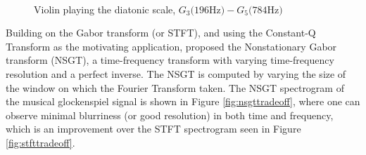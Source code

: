 \documentclass[report.tex]{subfiles}
\begin{document}
\begin{figure}[ht]
	\centering
	\\
	\caption{Violin playing the diatonic scale, $G_{3} \text{(196Hz)} - G_{5} \text{(784Hz)}$ \parencite[430]{jbrown}}
	\label{fig:violin}
\end{figure}

Building on the Gabor transform (or STFT), and using the Constant-Q Transform as the motivating application, \textcite{balazs} proposed the Nonstationary Gabor transform (NSGT), a time-frequency transform with varying time-frequency resolution and a perfect inverse. The NSGT is computed by varying the size of the window on which the Fourier Transform taken. The NSGT spectrogram of the musical glockenspiel signal is shown in Figure \ref{fig:nsgttradeoff}, where one can observe minimal blurriness (or good resolution) in both time and frequency, which is an improvement over the STFT spectrogram seen in Figure \ref{fig:stfttradeoff}.
\end{document}
